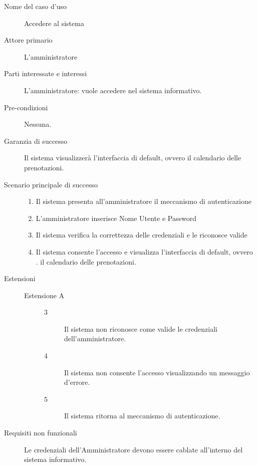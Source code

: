 \begin{description}
\item[Nome del caso d'uso]
       	Accedere al sistema

\item[Attore primario]
        L'amministratore

\item[Parti interessate e interessi]
        L'amministratore: vuole accedere nel sistema informativo.

\item[Pre-condizioni]
	Nessuna.

\item[Garanzia di successo]
        Il sistema visualizzerà l'interfaccia di default, ovvero il calendario
        delle prenotazioni.

\item[Scenario principale di successo]
\begin{enumerate}
\item Il sistema presenta all'amministratore il meccanismo di autenticazione
\item L'amministratore inserisce Nome Utente e Password
\item Il sistema verifica la correttezza delle credenziali e le riconosce valide
\item Il sistema consente l'accesso e visualizza l'interfaccia di default, ovvero .
	il calendario delle prenotazioni.
\end{enumerate}

\item[Estensioni]
\begin{description}
	\item[Estensione A]
	\medskip
	
	\begin{description}
	\item[3]
	Il sistema non riconosce come valide le credenziali dell'amministratore.
	\item[4]
	Il sistema non consente l'accesso visualizzando un messaggio d'errore.
	\item[5]
	Il sistema ritorna al meccanismo di autenticazione.
	\end{description}
	
\end{description}


\item[Requisiti non funzionali]
\begin{itemize}
\diam  Le credenziali dell'Amministratore devono essere cablate all'interno del
	sistema informativo.
\end{itemize}
\end{description}


